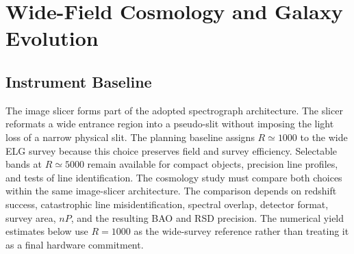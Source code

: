 \chapter{Wide-Field Cosmology and Galaxy Evolution}\label{app:cosmology}

\vspace{2mm}
\begin{center}
\end{center}

\section{Instrument Baseline}

The image slicer forms part of the adopted spectrograph architecture. The slicer reformats a wide entrance region into a pseudo-slit without imposing the light loss of a narrow physical slit. The planning baseline assigns $R\simeq1000$ to the wide ELG survey because this choice preserves field and survey efficiency. Selectable bands at $R\simeq5000$ remain available for compact objects, precision line profiles, and tests of line identification. The cosmology study must compare both choices within the same image-slicer architecture. The comparison depends on redshift success, catastrophic line misidentification, spectral overlap, detector format, survey area, $nP$, and the resulting BAO and RSD precision. The numerical yield estimates below use $R=1000$ as the wide-survey reference rather than treating it as a final hardware commitment.

